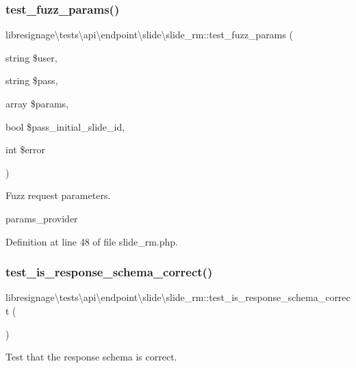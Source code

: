 \subsubsection{\texorpdfstring{test\+\_\+fuzz\+\_\+params()}{test\_fuzz\_params()}}
{\footnotesize\ttfamily libresignage\textbackslash{}tests\textbackslash{}api\textbackslash{}endpoint\textbackslash{}slide\textbackslash{}slide\+\_\+rm\+::test\+\_\+fuzz\+\_\+params (\begin{DoxyParamCaption}\item[{string}]{\$user,  }\item[{string}]{\$pass,  }\item[{array}]{\$params,  }\item[{bool}]{\$pass\+\_\+initial\+\_\+slide\+\_\+id,  }\item[{int}]{\$error }\end{DoxyParamCaption})}

Fuzz request parameters.

params\+\_\+provider 

Definition at line 48 of file slide\+\_\+rm.\+php.

\mbox{\label{classlibresignage_1_1tests_1_1api_1_1endpoint_1_1slide_1_1slide__rm_a37bf0aff36ef6fed34a712bc7cd624dc}} 
\subsubsection{\texorpdfstring{test\+\_\+is\+\_\+response\+\_\+schema\+\_\+correct()}{test\_is\_response\_schema\_correct()}}
{\footnotesize\ttfamily libresignage\textbackslash{}tests\textbackslash{}api\textbackslash{}endpoint\textbackslash{}slide\textbackslash{}slide\+\_\+rm\+::test\+\_\+is\+\_\+response\+\_\+schema\+\_\+correct (\begin{DoxyParamCaption}{ }\end{DoxyParamCaption})}

Test that the response schema is correct. 

